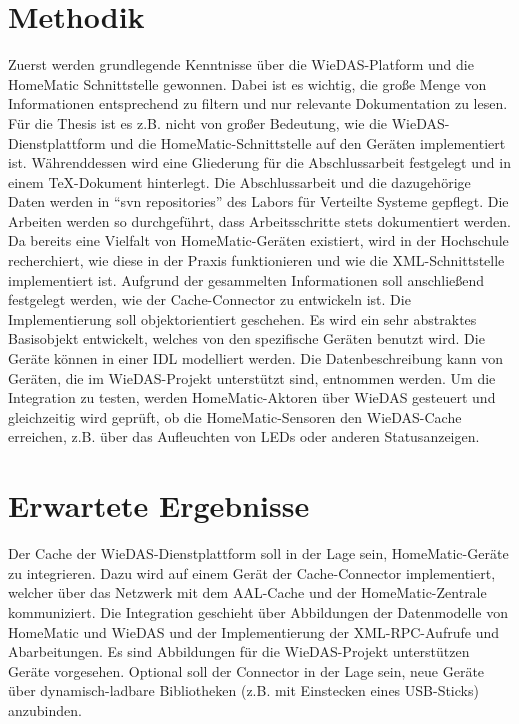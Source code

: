 \documentclass[a4paper,11pt]{article}
\begin{document}
\section{Methodik}
Zuerst werden grundlegende Kenntnisse über die WieDAS-Platform und die HomeMatic Schnittstelle gewonnen.
Dabei ist es wichtig, die große Menge von Informationen entsprechend zu filtern und nur relevante Dokumentation
zu lesen.
Für die Thesis ist es z.B. nicht von großer Bedeutung, wie die WieDAS-Dienstplattform und die HomeMatic-Schnittstelle
auf den Geräten implementiert ist.
Währenddessen wird eine Gliederung für die Abschlussarbeit festgelegt und in einem TeX-Dokument hinterlegt.
Die Abschlussarbeit und die dazugehörige Daten werden in ``svn repositories'' des Labors für Verteilte Systeme
gepflegt.
Die Arbeiten werden so durchgeführt, dass Arbeitsschritte stets dokumentiert werden.
Da bereits eine Vielfalt von HomeMatic-Geräten existiert, wird in der Hochschule recherchiert, wie diese
in der Praxis funktionieren und wie die XML-Schnittstelle implementiert ist.
Aufgrund der gesammelten Informationen soll anschließend festgelegt werden, wie der Cache-Connector zu entwickeln ist.
Die Implementierung soll objektorientiert geschehen.
Es wird ein sehr abstraktes Basisobjekt entwickelt, welches von den spezifische Geräten benutzt wird.
Die Geräte können in einer IDL modelliert werden.
Die Datenbeschreibung kann von Geräten, die im WieDAS-Projekt unterstützt sind, entnommen werden.
Um die Integration zu testen, werden HomeMatic-Aktoren über WieDAS gesteuert und gleichzeitig wird geprüft, ob die
HomeMatic-Sensoren den WieDAS-Cache erreichen, z.B. über das Aufleuchten von LEDs oder anderen Statusanzeigen.

\section{Erwartete Ergebnisse}
Der Cache der WieDAS-Dienstplattform soll in der Lage sein, HomeMatic-Geräte zu integrieren.
Dazu wird auf einem Gerät der Cache-Connector implementiert, welcher über das Netzwerk mit dem AAL-Cache und
der HomeMatic-Zentrale kommuniziert.
Die Integration geschieht über Abbildungen der Datenmodelle von HomeMatic und WieDAS und der Implementierung
der XML-RPC-Aufrufe und Abarbeitungen.
Es sind Abbildungen für die WieDAS-Projekt unterstützen Geräte vorgesehen.
Optional soll der Connector in der Lage sein, neue Geräte über dynamisch-ladbare Bibliotheken (z.B. mit Einstecken
eines USB-Sticks) anzubinden.
\end{document}
